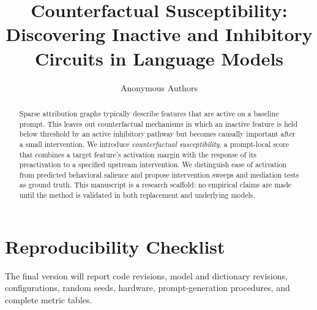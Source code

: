 \documentclass[11pt]{article}
\title{Counterfactual Susceptibility:\\Discovering Inactive and Inhibitory Circuits in Language Models}
\author{Anonymous Authors}
\date{}
\begin{document}
\maketitle

\begin{abstract}
Sparse attribution graphs typically describe features that are active on a baseline prompt. This leaves out counterfactual mechanisms in which an inactive feature is held below threshold by an active inhibitory pathway but becomes causally important after a small intervention. We introduce \emph{counterfactual susceptibility}, a prompt-local score that combines a target feature's activation margin with the response of its preactivation to a specified upstream intervention. We distinguish ease of activation from predicted behavioral salience and propose intervention sweeps and mediation tests as ground truth. This manuscript is a research scaffold: no empirical claims are made until the method is validated in both replacement and underlying models.
\end{abstract}












\appendix
\section{Reproducibility Checklist}
The final version will report code revisions, model and dictionary revisions, configurations, random seeds, hardware, prompt-generation procedures, and complete metric tables.
\end{document}
